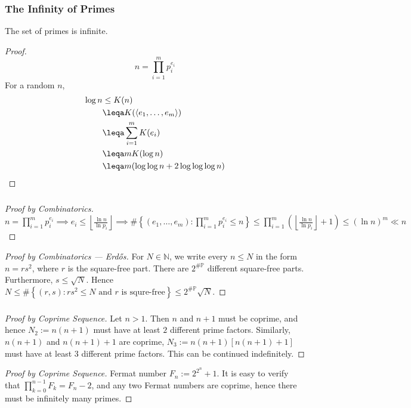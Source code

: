 \documentclass[UTF8,aspectratio=43,11pt,colorlinks,compress,openany]{beamer}%
\begin{document}
\begin{frame}\frametitle{The Infinity of Primes}
\setlength\abovedisplayskip{0pt}
\setlength\belowdisplayskip{0pt}
	\vspace*{-.15\textheight}
	\begin{theorem}
		The set of primes is infinite.
	\end{theorem}
	\vspace*{-.01\textheight}
	\begin{proof}
		\[n=\prod\limits_{i=1}^m p_i^{e_i}\]
		For a random $n$,
		\begin{align*}
		\log n &\leq K(n)\\
		&\leqa K(\langle e_1,\ldots,e_m\rangle)\\
		&\leqa\sum\limits_{i=1}^m K(e_i)\\
		&\leqa mK(\log n)\\
		&\leqa m(\log\log n+2\log\log\log n)
		\end{align*}
	\end{proof}\vspace*{-.49\textwidth}
\end{frame}

\begin{frame}\frametitle{}
\begin{proof}[Proof by Combinatorics]
	$n=\prod\limits_{i=1}^m p_i^{e_i}\implies e_i\leq\left\lfloor\frac{\ln n}{\ln p_i}\right\rfloor\implies\#\left\{(e_1,\dots,e_m): \prod\limits_{i=1}^m p_i^{e_i}\leq n\right\}\leq \prod\limits_{i=1}^m\left(\left\lfloor\frac{\ln n}{\ln p_i}\right\rfloor+1\right)\leq (\ln n)^m\ll n$
\end{proof}
\begin{proof}[Proof by Combinatorics --- Erd\H{o}s]
For $N\in\mathbb{N}$, we write every $n\leq N$ in the form $n=rs^2$, where $r$ is the square-free part. There are $2^{\#\mathbb{P}}$ different square-free parts. Furthermore, $s\leq\sqrt{N}$. Hence $N\leq\#\left\{(r,s): rs^2\leq N \mbox{ and $r$ is squre-free}\right\}\leq 2^{\#\mathbb{P}}\sqrt{N}$.
\end{proof}
\end{frame}

\begin{frame}\frametitle{}
\begin{proof}[Proof by Coprime Sequence]
Let $n>1$. Then $n$ and $n+1$ must be coprime, and hence $N_2:=n(n + 1)$ must have at least $2$ different prime factors. Similarly, $n(n+1)$ and $n(n+1)+1$ are coprime, $N_3:=n(n + 1)[n(n + 1) + 1]$ must have at least $3$ different prime factors. This can be continued indefinitely.
\end{proof}
\begin{proof}[Proof by Coprime Sequence]
Fermat number $F_n:=2^{2^n}+1$. It is easy to verify that $\prod\limits_{k=0}^{n-1}F_k=F_n-2$, and any two Fermat numbers are coprime, hence there must be infinitely many primes.
\end{proof}
\end{frame}
\end{document}
